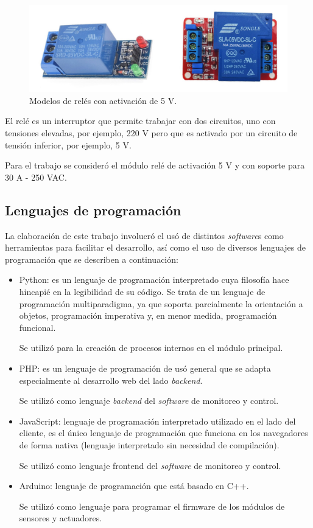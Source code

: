 \begin{figure}[htbp]
	\centering
	\includegraphics[width=1.0\textwidth]{./Figures/rele.jpg}
	\caption{Modelos de relés con activación de 5 V.}

	\label{fig:rele}
\end{figure}

El relé es un interruptor que permite trabajar con dos circuitos, uno con tensiones elevadas, por ejemplo, 220 V pero que es activado por un circuito de tensión inferior, por ejemplo, 5 V.

Para el trabajo se consideró el módulo relé de activación 5 V y con soporte para 30 A - 250 VAC.

\subsection{Lenguajes de programación}

La elaboración de este trabajo involucró el usó de distintos \emph{software}s como herramientas para facilitar el desarrollo, así como el uso de diversos lenguajes de programación que se describen a continuación:
\begin{itemize}
\item Python: es un lenguaje de programación interpretado cuya filosofía hace hincapié en la legibilidad de su código. Se trata de un lenguaje de programación multiparadigma, ya que soporta parcialmente la orientación a objetos, programación imperativa y, en menor medida, programación funcional.

Se utilizó para la creación de procesos internos en el módulo principal. 
\item PHP: es un lenguaje de programación de usó general que se adapta especialmente al desarrollo web del lado \emph{backend}.

Se utilizó como lenguaje \emph{backend} del \emph{software} de monitoreo y control.
\item JavaScript: lenguaje de programación interpretado utilizado en el lado del cliente, es el único lenguaje de programación que funciona en los navegadores de forma nativa (lenguaje interpretado sin necesidad de compilación).

Se utilizó como lenguaje frontend del \emph{software} de monitoreo y control.
\item Arduino: lenguaje de programación que está basado en C++.

Se utilizó como lenguaje para programar el firmware de los módulos de sensores y actuadores.
\end{itemize}